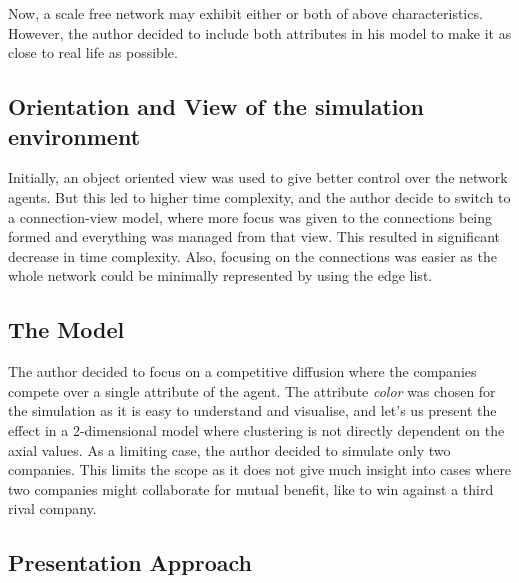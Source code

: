 Now, a scale free network may exhibit either or both of above characteristics. However, the author decided to include both attributes in his model to make it as close to real life as possible. 

\subsection{Orientation and View of the simulation environment}

Initially, an object oriented view was used to give better control over the network agents. But this led to higher time complexity, and the author decide to switch to a connection-view model, where more focus was given to the connections being formed and everything was managed from that view. This resulted in significant decrease in time complexity.
Also, focusing on the connections was easier as the whole network could be minimally represented by using the edge list.



\subsection{The Model}
The author decided to focus on a competitive diffusion where the companies compete over a single attribute of the agent. The attribute \emph{color} was chosen for the simulation as it is easy to understand and visualise, and let's us present the effect in a 2-dimensional model where clustering is not directly dependent on the axial values. 
As a limiting case, the author decided to simulate only two companies. This limits the scope as it does not give much insight into cases where two companies might collaborate for mutual benefit, like to win against a third rival company.


\subsection{Presentation Approach}

